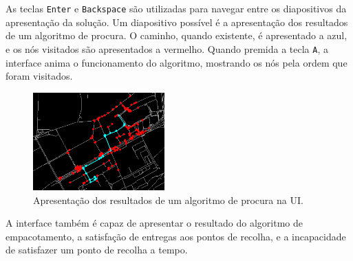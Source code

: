 \documentclass[12pt, a4paper, titlepage]{article}
\begin{document}
As teclas \texttt{Enter} e \texttt{Backspace} são utilizadas para navegar entre os diapositivos da
apresentação da solução. Um diapositivo possível é a apresentação dos resultados de um algoritmo de
procura. O caminho, quando existente, é apresentado a azul, e os nós visitados são apresentados a
vermelho. Quando premida a tecla \texttt{A}, a interface anima o funcionamento do algoritmo,
mostrando os nós pela ordem que foram visitados.

\begin{figure}[H]
    \centering
    \includegraphics[width=0.45\textwidth]{res/Procura.png}
    \caption{Apresentação dos resultados de um algoritmo de procura na UI.}
\end{figure}

A interface também é capaz de apresentar o resultado do algoritmo de empacotamento, a satisfação de
entregas aos pontos de recolha, e a incapacidade de satisfazer um ponto de recolha a tempo.
\end{document}
